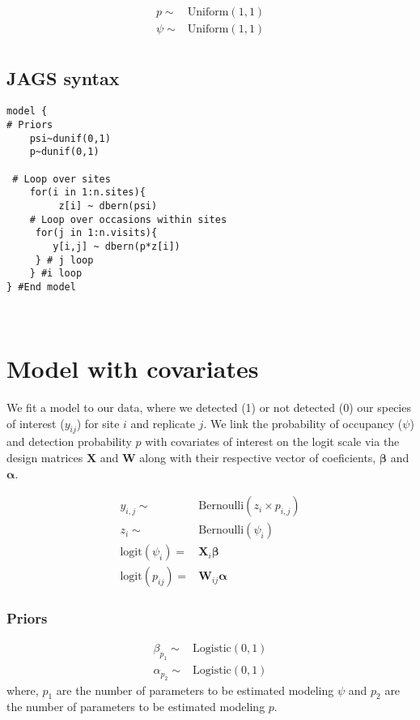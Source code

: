 \documentclass[12pt]{article}
\begin{document}
\begin{align*}
p \sim& \text{Uniform}(1, 1)\\
\psi \sim& \text{Uniform}(1, 1)\\
\end{align*}


\subsection{JAGS syntax}

\begin{verbatim}
model {
# Priors
	psi~dunif(0,1)
	p~dunif(0,1)
	
 # Loop over sites	
	for(i in 1:n.sites){
	     z[i] ~ dbern(psi)
	# Loop over occasions within sites			
	 for(j in 1:n.visits){
		y[i,j] ~ dbern(p*z[i])
	 } # j loop
	} #i loop
} #End model



\end{verbatim}





\section{Model with covariates}


We fit a model to our data, where we detected (1) or not detected (0) our species of interest ($y_{ij}$) for site $i$ and replicate $j$. We link the probability of occupancy ($\psi$) and detection probability $p$ with covariates of interest on the logit scale via the design matrices $\textbf{X}$ and $\textbf{W}$ along with their respective vector of coeficients, $\boldsymbol{\beta}$ and $\boldsymbol{\alpha}$. 

\begin{align*}
y_{i,j}\sim& \text{Bernoulli}(z_{i} \times p_{i,j})\\
z_{i} \sim&  \text{Bernoulli}(\psi_{i})\\
\text{logit}(\psi_{i}) =& \textbf{X}_{i}\boldsymbol{\beta}\\
\text{logit}(p_{ij}) =& \textbf{W}_{ij}\boldsymbol{\alpha}
\end{align*}

\subsubsection{Priors}
\begin{align*}
\beta_{p_1} \sim& \text{Logistic}(0, 1)\\
\alpha_{p_2} \sim& \text{Logistic}(0, 1)
\end{align*}
where, $p_{1}$ are the number of parameters to be estimated modeling $\psi$ and $p_{2}$ are the number of parameters to be estimated modeling $p$.
\end{document}
